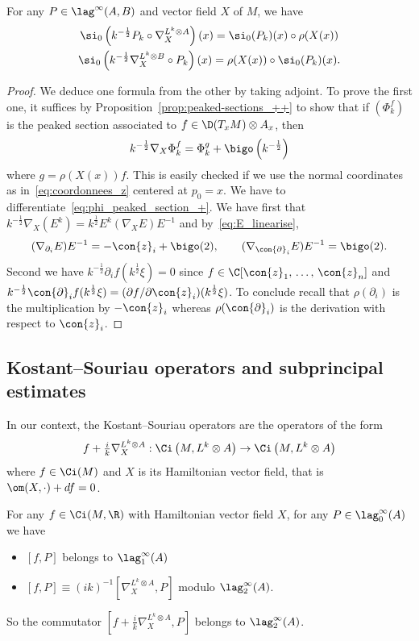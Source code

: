 \begin{lemm}\label{lem:symb_der}
For any $P \in \lag^{\infty}(A,B)$ and vector field $X$ of $M$, we have
\begin{gather*}
\si_0 \left(k^{-\frac{1}{2}} P_k \circ \nabla^{L^k
\otimes A}_X\right) (x) = \si_0 (P_k) (x) \circ \rho (X(x)) \\
 \si_0 \left(k^{-\frac{1}{2}} \nabla^{L^k
\otimes B}_X \circ P_k\right) (x) = \rho (X(x)) \circ \si_0 (P_k) (x). 
\end{gather*}
\end{lemm}

\begin{proof}
We deduce one formula from the other by taking adjoint. To
prove the first one, it suffices by Proposition~\ref{prop:peaked-sections_++} to show that if $(\Phi_k^f)$ is the peaked section associated to $ f\in \D(T_xM) \otimes A_x$, then
\[
k^{-\frac{1}{2}}
\nabla_X \Phi_k^f = \Phi_k^g + \bigo \left(k^{-\frac{1}{2}}\right)
\]
where $g = \rho (X(x)) f $. This is easily checked if we use the normal coordinates as in~\eqref{eq:coordonnees_z} centered at $p_0 = x$. We have to differentiate~\eqref{eq:phi_peaked_section_+}. We have first that $k^{-\frac{1}{2}} \nabla_X (E^k) = k^{\frac{1}{2}} E^k (\nabla_X
E)E^{-1}$ and by~\eqref{eq:E_linearise},
\[
(\nabla_{\partial_i} E)E^{-1} =
- \con{z}_i + \bigo (2), \qquad (\nabla_{\con{\partial}_i} E)E^{-1} =
\bigo (2).
\]
Second we have $ k^{-\frac{1}{2}} \partial_i f (k^{\frac{1}{2}} \xi) = 0$ since $f \in \C [\con{z}_1, \,\ldots,\, \con{z}_n]$ and $ k^{-\frac{1}{2}} \con{\partial}_i f (k^{\frac{1}{2}} \xi) = (\partial f / \partial \con{z}_i) (k^{\frac{1}{2}} \xi)$. To conclude recall that $\rho (\partial_i) $ is the multiplication by $-\con{z}_i$ whereas $\rho (\con{\partial}_i)$ is the derivation with respect to $\con{z}_i$.
\end{proof}

\subsection{Kostant--Souriau operators and subprincipal estimates}

In our context, the Kostant--Souriau operators are the operators of the form
\[
f + \tfrac{i}{k} \nabla_X^{L^k \otimes A} : \Ci \left(M, L^k \otimes A\right)
\rightarrow \Ci \left(M, L^k \otimes A\right)
\]
where $ f \in \Ci (M)$ and $X$ is its
Hamiltonian vector field, that is $\om (X, \cdot) + df =0$.

\begin{lemm}\label{lem:ledernier}
For any $f \in \Ci (M, \R)$ with Hamiltonian vector field $X$, for any $P \in \lag^{\infty}_0 (A)$ we have
\begin{itemize}
\item $ [f, P]$ belongs to $\lag_{1}^{\infty} (A)$
\item $[f,P] \equiv (ik)^{-1} [\nabla_X^{L^k
\otimes A}, P]$ modulo $\lag_{2}^{\infty} (A)$.
\end{itemize}
So the commutator $[f +\frac{i}{k} \nabla_X^{L^k \otimes A}, P]$ belongs to $\lag_{2}^{\infty}(A)$.
\end{lemm}

